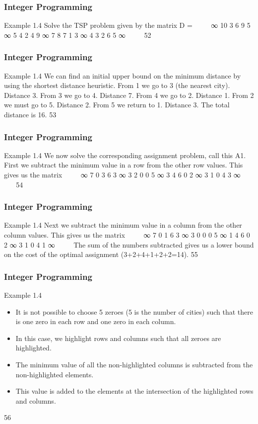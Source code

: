 \begin{frame}
\frametitle{Integer Programming}     
Example 1.4
Solve the TSP problem given by the matrix
D =


∞ 10 3 6 9
5 ∞ 5 4 2
4 9 ∞ 7 8
7 1 3 ∞ 4
3 2 6 5 ∞


52 \end{frame}  \begin{frame} \frametitle{Integer Programming}     
Example 1.4
We can find an initial upper bound on the minimum distance by
using the shortest distance heuristic.
From 1 we go to 3 (the nearest city). Distance 3. From 3 we go to
4. Distance 7.
From 4 we go to 2. Distance 1. From 2 we must go to 5. Distance
2.
From 5 we return to 1. Distance 3. The total distance is 16.
53 \end{frame}  \begin{frame} \frametitle{Integer Programming}     
Example 1.4
We now solve the corresponding assignment problem, call this A1.
First we subtract the minimum value in a row from the other row
values. This gives us the matrix


∞ 7 0 3 6
3 ∞ 3 2 0
0 5 ∞ 3 4
6 0 2 ∞ 3
1 0 4 3 ∞


54 \end{frame}  \begin{frame} \frametitle{Integer Programming}     
Example 1.4
Next we subtract the minimum value in a column from the other
column values. This gives us the matrix


∞ 7 0 1 6
3 ∞ 3 0 0
0 5 ∞ 1 4
6 0 2 ∞ 3
1 0 4 1 ∞


The sum of the numbers subtracted gives us a lower bound on the
cost of the optimal assignment (3+2+4+1+2+2=14).
55 
\end{frame}  
\begin{frame} 
\frametitle{Integer Programming}     
Example 1.4
\begin{itemize}
	\item It is not possible to choose 5 zeroes (5 is the number of cities) such
	that there is one zero in each row and one zero in each column.
	\item In this case, we highlight rows and columns such that all zeroes are
	highlighted.
	\item The minimum value of all the non-highlighted columns is
	subtracted from the non-highlighted elements.
	\item This value is added to the elements at the intersection of the
	highlighted rows and columns.
\end{itemize}

56 
\end{frame}  
